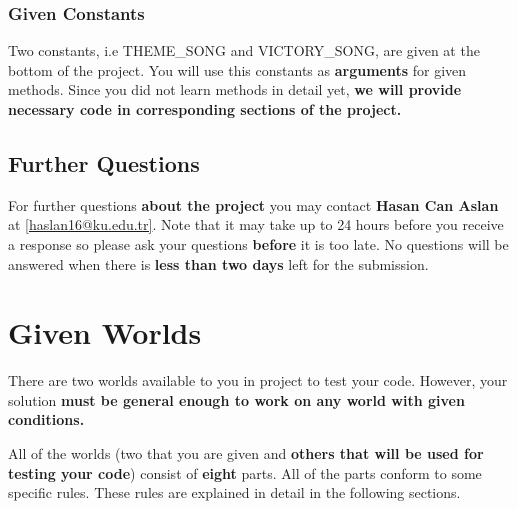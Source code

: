\documentclass[a4paper]{article}
\makeatletter
\newcommand{\contactName}{Hasan Can Aslan}
\newcommand{\contactMail}{haslan16@ku.edu.tr}
\makeatother
\begin{document}
\subsubsection{Given Constants}
Two constants, i.e THEME\_SONG and VICTORY\_SONG, are given at the bottom of the project. You will use this constants as \textbf{arguments} for given methods. Since you did not learn methods in detail yet, \textbf{we will provide necessary code in corresponding sections of the project.}

\subsection{Further Questions}
For further questions \textbf{about the project} you may contact \textbf{\contactName} at \href{mailto:\contactMail}{\mbox{[\contactMail]}}. Note that it may take up to 24 hours before you receive a response so please ask your questions \textbf{before} it is too late. No questions will be answered when there is \textbf{less than two days} left for the submission.

\newpage

\section{Given Worlds}
\label{worlds}
There are two worlds available to you in project to test your code. However, your solution \textbf{must be general enough to work on any world with given conditions.}


\noindent All of the worlds (two that you are given and \textbf{others that will be used for testing your code}) consist of \textbf{eight} parts. All of the parts conform to some specific rules. These rules are explained in detail in the following sections.

\end{document}
